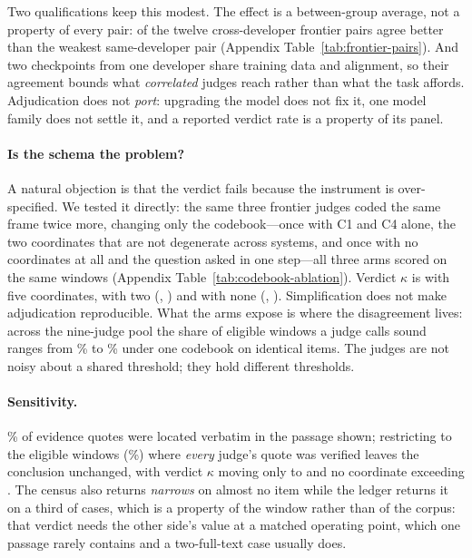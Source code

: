 \documentclass[11pt]{article}
\begin{document}
\noindent Two qualifications keep this modest. The effect is a between-group
average, not a property of every pair: \TierFrontCrossBeats{} of the twelve
cross-developer frontier pairs agree better than the weakest same-developer pair
(Appendix Table~\ref{tab:frontier-pairs}). And two checkpoints from one
developer share training data and alignment, so their agreement bounds what
\emph{correlated} judges reach rather than what the task affords. Adjudication
does not \emph{port}: upgrading the model does not fix it, one model family does
not settle it, and a reported verdict rate is a property of its panel.

\paragraph{Is the schema the problem?}
A natural objection is that the verdict fails because the instrument is
over-specified. We tested it directly: the same three frontier judges coded the
same frame twice more, changing only the codebook---once with C1 and C4 alone,
the two coordinates that are not degenerate across systems, and once with no
coordinates at all and the question asked in one step---all three arms scored on
the same \AblItems{} windows (Appendix Table~\ref{tab:codebook-ablation}).
Verdict $\kappa$ is \AblFiveK{} with five coordinates, \AblCFourK{} with two
(\AblCFourDelta{}, \AblCFourCI{}) and \AblDirectK{} with none
(\AblDirectDelta{}, \AblDirectCI{}). Simplification does not make adjudication
reproducible. What the arms expose is where the disagreement lives: across the
nine-judge pool the share of eligible windows a judge calls sound ranges from
\TierSurvivesLo\% to \TierSurvivesHi\% under one codebook on identical items. The judges are not noisy
about a shared threshold; they hold different thresholds.

\paragraph{Sensitivity.}
\CensusQuoteRate\% of evidence quotes were located verbatim in the passage
shown; restricting to the \QuoteVerifiedN{} eligible windows
(\QuoteVerifiedPct\%) where \emph{every} judge's quote was verified leaves the
conclusion unchanged, with verdict $\kappa$ moving only to \QuoteVerdictK{} and
no coordinate exceeding \QuoteCoordKMax{}. The census also returns
\emph{narrows} on almost no item while the ledger returns it on a third of
cases, which is a property of the window rather than of the corpus: that verdict
needs the other side's value at a matched operating point, which one passage
rarely contains and a two-full-text case usually does.
\end{document}
